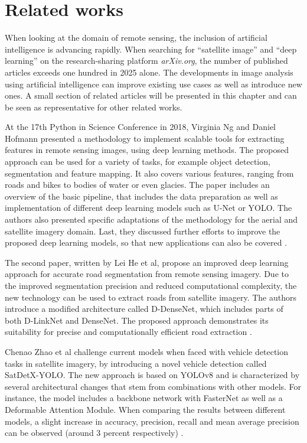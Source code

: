 \section{Related works}

When looking at the domain of remote sensing, the inclusion of artificial intelligence is advancing rapidly. When searching for “satellite image” and “deep learning” on the research-sharing platform \textit{arXiv.org}, the number of published articles exceeds one hundred in 2025 alone. The developments in image analysis using artificial intelligence can improve existing use cases as well as introduce new ones. A small section of related articles will be presented in this chapter and can be seen as representative for other related works.

At the 17th Python in Science Conference in 2018, Virginia Ng and Daniel Hofmann presented a methodology to implement scalable tools for extracting features in remote sensing images, using deep learning methods. The proposed approach can be used for a variety of tasks, for example object detection, segmentation and feature mapping. It also covers various features, ranging from roads and bikes to bodies of water or even glacies. The paper includes an overview of the basic pipeline, that includes the data preparation as well as implementation of different deep learning models such as U-Net or YOLO. The authors also presented specific adaptations of the methodology for the aerial and satellite imagery domain. Last, they discussed further efforts to improve the proposed deep learning models, so that new applications can also be covered \cite{relWork1}.

The second paper, written by Lei He et al, propose an improved deep learning approach for accurate road segmentation from remote sensing imagery. Due to the improved segmentation precision and reduced computational complexity, the new technology can be used to extract roads from satellite imagery. The authors introduce a modified architecture called D-DenseNet, which includes parts of both D-LinkNet and DenseNet. The proposed approach demonstrates its suitability for precise and computationally efficient road extraction \cite{relWork2}.

Chenao Zhao et al challenge current models when faced with vehicle detection tasks in satellite imagery, by introducing a novel vehicle detection called SatDetX-YOLO. The new approach is based on YOLOv8 and is characterized by several architectural changes that stem from combinations with other models. For instance, the model includes a backbone network with FasterNet as well as a Deformable Attention Module. When comparing the results between different models, a slight increase in accuracy, precision, recall and mean average precision can be observed (around 3 percent respectively) \cite{relWork3}.

